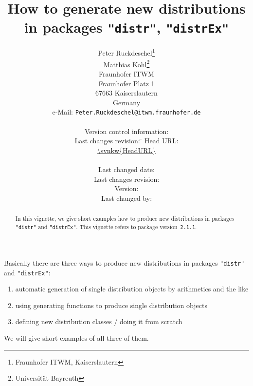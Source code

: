 \documentclass[10pt]{article}
\def\pkg#1{{\tt "#1"}}
\newcommand{\pkgversion}{{\tt 2.1.1}}
\begin{document}
\title{How to generate new distributions in packages \pkg{distr}, \pkg{distrEx}}
\author{\small Peter Ruckdeschel\thanks{Fraunhofer ITWM, Kaiserslautern}
\\[-.5ex]
\small Matthias Kohl\thanks{Universit\"at Bayreuth}
\smallskip\\
\small Fraunhofer ITWM\\[-.5ex]
\small Fraunhofer Platz 1\\[-.5ex]
\small 67663 Kaiserslautern\\[-.5ex]
\small Germany\\
\small e-Mail: {\small \tt Peter.Ruckdeschel@itwm.fraunhofer.de}\medskip\\
\parbox[t]{5cm}{
\footnotesize\sffamily
 Version control information:
\begin{tabbing}
\footnotesize\sffamily
 Last changes revision: \= \kill
 Head URL: \> \parbox[t]{6cm}{\url{\svnkw{HeadURL}}}\\[1.2ex]
 Last changed date: \> \svndate\\
 Last changes revision: \> \svnrev\\
 Version: \> \svnFullRevision*{\svnrev}\\
 Last changed by: \> \svnFullAuthor*{\svnauthor}\\
\end{tabbing}
}}

\maketitle
\begin{abstract}
In this vignette, we give short examples how to produce new
distributions in packages \pkg{distr} and \pkg{distrEx}.
This vignette refers to package version~\pkgversion.
\end{abstract}
Basically there are three ways to produce new
distributions in packages \pkg{distr} and \pkg{distrEx}:
\begin{enumerate}
\item automatic generation of single distribution objects by arithmetics and the like
\item using generating functions to produce single distribution objects
\item defining new distribution classes / doing it from scratch
\end{enumerate}
We will give short examples of all three of them.
\end{document}
